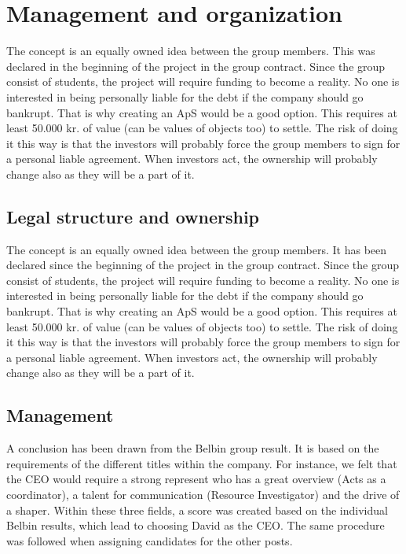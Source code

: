 \section{Management and organization}
The concept is an equally owned idea between the group members. This was declared in the beginning of the project in the group contract.
Since the group consist of students, the project will require funding to become a reality. No one is interested in being personally liable for the debt if the company should go bankrupt. That is why creating an ApS would be a good option. This requires at least 50.000 kr. of value (can be values of objects too) to settle. The risk of doing it this way is that the investors will probably force the group members to sign for a personal liable agreement. 
When investors act, the ownership will probably change also as they will be a part of it.

\subsection{Legal structure and ownership}
The concept is an equally owned idea between the group members. It has been declared since the beginning of the project in the group contract.
Since the group consist of students, the project will require funding to become a reality. No one is interested in being personally liable for the debt if the company should go bankrupt. That is why creating an ApS would be a good option. This requires at least 50.000 kr. of value (can be values of objects too) to settle. The risk of doing it this way is that the investors will probably force the group members to sign for a personal liable agreement. 
When investors act, the ownership will probably change also as they will be a part of it.
\subsection{Management}
A conclusion has been drawn from the Belbin group result. It is based on the requirements of the different titles within the company.  For instance, we felt that the CEO would require a strong represent who has a great overview (Acts as a coordinator), a talent for communication (Resource Investigator) and the drive of a shaper. Within these three fields, a score was created based on the individual Belbin results, which lead to choosing David as the CEO. 
The same procedure was followed when assigning candidates for the other posts. 

